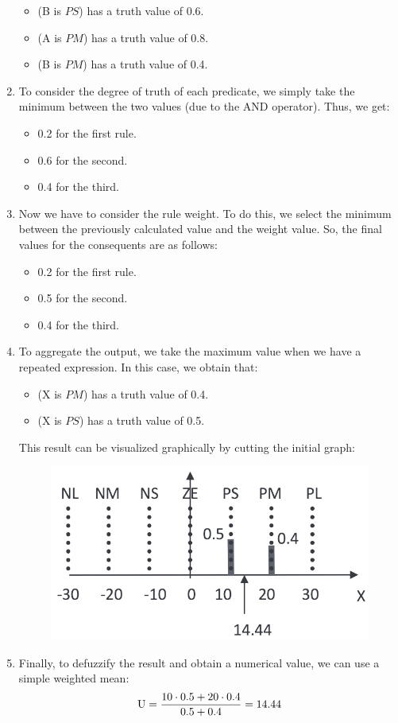\documentclass[12pt, a4paper]{report}
\begin{document}
\begin{example}
\begin{enumerate}
\begin{itemize}
                    \item (B is $PS$) has a truth value of 0.6.
                    \item (A is $PM$) has a truth value of 0.8.
                    \item (B is $PM$) has a truth value of 0.4.
                \end{itemize}
            \item To consider the degree of truth of each predicate, we simply take the minimum between the two values (due to the AND operator). 
                Thus, we get: 
                \begin{itemize}
                    \item 0.2 for the first rule. 
                    \item 0.6 for the second. 
                    \item 0.4 for the third.
                \end{itemize}
            \item Now we have to consider the rule weight. 
                To do this, we select the minimum between the previously calculated value and the weight value. 
                So, the final values for the consequents are as follows:
                \begin{itemize}
                    \item 0.2 for the first rule. 
                    \item 0.5 for the second. 
                    \item 0.4 for the third.
                \end{itemize}
            \item To aggregate the output, we take the maximum value when we have a repeated expression. 
                In this case, we obtain that: 
                \begin{itemize}
                    \item (X is $PM$) has a truth value of 0.4.
                    \item (X is $PS$) has a truth value of 0.5.
                \end{itemize}
                This result can be visualized graphically by cutting the initial graph: 
                \begin{figure}[H]
                    \centering
                    \includegraphics[width=0.4\linewidth]{images/cut.png}
                \end{figure}
            \item Finally, to defuzzify the result and obtain a numerical value, we can use a simple weighted mean:
                \[\textnormal{U}=\dfrac{10 \cdot 0.5 + 20 \cdot 0.4}{0.5+0.4}=14.44\]
        \end{enumerate}
    \end{example}
\end{document}
